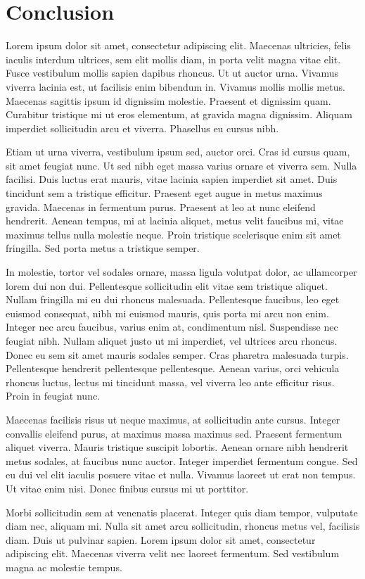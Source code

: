 \chapter*{Conclusion}
\label{sec:conclusion}




Lorem ipsum dolor sit amet, consectetur adipiscing elit. Maecenas ultricies, felis iaculis interdum ultrices, sem elit mollis diam, in porta velit magna vitae elit. Fusce vestibulum mollis sapien dapibus rhoncus. Ut ut auctor urna. Vivamus viverra lacinia est, ut facilisis enim bibendum in. Vivamus mollis mollis metus. Maecenas sagittis ipsum id dignissim molestie. Praesent et dignissim quam. Curabitur tristique mi ut eros elementum, at gravida magna dignissim. Aliquam imperdiet sollicitudin arcu et viverra. Phasellus eu cursus nibh.

Etiam ut urna viverra, vestibulum ipsum sed, auctor orci. Cras id cursus quam, sit amet feugiat nunc. Ut sed nibh eget massa varius ornare et viverra sem. Nulla facilisi. Duis luctus erat mauris, vitae lacinia sapien imperdiet sit amet. Duis tincidunt sem a tristique efficitur. Praesent eget augue in metus maximus gravida. Maecenas in fermentum purus. Praesent at leo at nunc eleifend hendrerit. Aenean tempus, mi at lacinia aliquet, metus velit faucibus mi, vitae maximus tellus nulla molestie neque. Proin tristique scelerisque enim sit amet fringilla. Sed porta metus a tristique semper.

In molestie, tortor vel sodales ornare, massa ligula volutpat dolor, ac ullamcorper lorem dui non dui. Pellentesque sollicitudin elit vitae sem tristique aliquet. Nullam fringilla mi eu dui rhoncus malesuada. Pellentesque faucibus, leo eget euismod consequat, nibh mi euismod mauris, quis porta mi arcu non enim. Integer nec arcu faucibus, varius enim at, condimentum nisl. Suspendisse nec feugiat nibh. Nullam aliquet justo ut mi imperdiet, vel ultrices arcu rhoncus. Donec eu sem sit amet mauris sodales semper. Cras pharetra malesuada turpis. Pellentesque hendrerit pellentesque pellentesque. Aenean varius, orci vehicula rhoncus luctus, lectus mi tincidunt massa, vel viverra leo ante efficitur risus. Proin in feugiat nunc.

Maecenas facilisis risus ut neque maximus, at sollicitudin ante cursus. Integer convallis eleifend purus, at maximus massa maximus sed. Praesent fermentum aliquet viverra. Mauris tristique suscipit lobortis. Aenean ornare nibh hendrerit metus sodales, at faucibus nunc auctor. Integer imperdiet fermentum congue. Sed eu dui vel elit iaculis posuere vitae et nulla. Vivamus laoreet ut erat non tempus. Ut vitae enim nisi. Donec finibus cursus mi ut porttitor.

Morbi sollicitudin sem at venenatis placerat. Integer quis diam tempor, vulputate diam nec, aliquam mi. Nulla sit amet arcu sollicitudin, rhoncus metus vel, facilisis diam. Duis ut pulvinar sapien. Lorem ipsum dolor sit amet, consectetur adipiscing elit. Maecenas viverra velit nec laoreet fermentum. Sed vestibulum magna ac molestie tempus. 